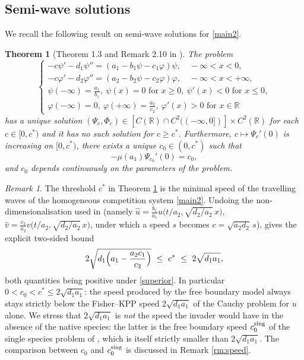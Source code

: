 \documentclass[reqno]{amsart}
\newcommand{\rev}[1]{#1}
\theoremstyle{plain}
\newtheorem{theorem}{Theorem}
\theoremstyle{definition}
\theoremstyle{remark}
\newtheorem{remark}{Remark}
\begin{document}
	\subsection{Semi-wave solutions}
	We recall the following result on semi-wave solutions for \eqref{main2}.
	\begin{theorem}[Theorem 1.3 and Remark 2.10 in \cite{MR3609207}]\label{th:semi-wave0} The problem
		\begin{equation}\label{semi-wave0}
			\begin{cases}
				-c \psi' - d_1 \psi'' = (a_1 - b_1\psi - c_1\varphi)\psi, \quad-\infty < x < 0,\\
				-c \varphi' - d_2 \varphi'' = (a_2 - b_2\psi - c_2\varphi)\varphi, \quad -\infty < x < +\infty,\\
				\psi(-\infty) = \frac{a_1}{b_1}, ~ \psi(x)=0 \text{ for } x\ge 0, ~ \psi'(x)<0 \text{ for } x\le 0,\\	
				\varphi(-\infty) = 0, ~ \varphi(+\infty)=\frac{a_2}{c_2}, ~ \varphi'(x)>0 \text{ for } x\in\mathbb{R}
			\end{cases}
		\end{equation}
		has a unique solution $(\Psi_c, \Phi_c) \in [C(\mathbb{R})\cap C^2((-\infty, 0])] \times C^2(\mathbb{R})$ for each $c\in[0,c^*)$ and it has no such solution for $c\ge c^*$. Furthermore, $c\mapsto \Psi_c'(0)$ is increasing on $[0,c^*)$, there exists a unique $c_0 \in (0,c^*)$ such that
		\[
		-\mu(a_1) \Psi_{c_0}'(0) = c_0,
		\]
		and $c_0$ depends continuously on the parameters of the problem.
	\end{theorem}
	
	\rev{\begin{remark}\label{rm:cstar}
		The threshold $c^*$ in Theorem \textup{\ref{th:semi-wave0}} is the minimal
		speed of the travelling waves of the homogeneous competition system
		\eqref{main2}. Undoing the non-dimensionalisation used in
		\cite{MR3609207} (namely
		$\hat u=\frac{b_1}{a_1}u\bigl(t/a_2,\sqrt{d_2/a_2}\,x\bigr)$,
		$\hat v=\frac{c_2}{a_2}v\bigl(t/a_2,\sqrt{d_2/a_2}\,x\bigr)$, under which a
		speed $s$ becomes $c=\sqrt{a_2d_2}\,s$), \cite[Proposition 1.2]{MR3609207}
		gives the explicit two-sided bound
		\[
		2\sqrt{d_1\Bigl(a_1-\frac{a_2c_1}{c_2}\Bigr)}\ \le\ c^*\ \le\ 2\sqrt{d_1a_1},
		\]
		both quantities being positive under \eqref{superior}. In particular
		$0<c_0<c^*\le2\sqrt{d_1a_1}$: the speed produced by the free boundary model
		always stays strictly below the Fisher--KPP speed $2\sqrt{d_1a_1}$ of the
		Cauchy problem for $u$ alone. We stress that $2\sqrt{d_1a_1}$ is
		\emph{not} the speed the invader would have in the absence of the native
		species: the latter is the free boundary speed $c_0^{\rm sing}$ of the
		single species problem of \cite{MR2607347}, which is itself strictly
		smaller than $2\sqrt{d_1a_1}$. The comparison between $c_0$ and
		$c_0^{\rm sing}$ is discussed in Remark \textup{\ref{rm:speed}}.
	\end{remark}}
\end{document}
